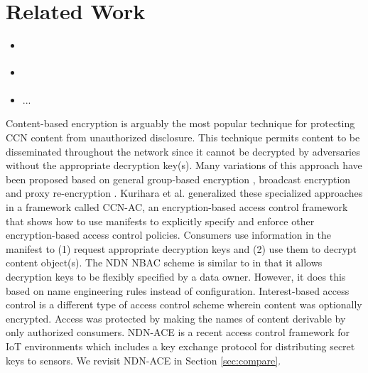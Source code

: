 \section{Related Work} \label{sec:related}

\begin{itemize}
\item \cite{tsudik2016ac3n}
\item \cite{dibenedetto2011andana}
\item ...
\end{itemize}

Content-based encryption is arguably the most popular technique for protecting CCN content from
unauthorized disclosure. This technique permits content to be disseminated throughout
the network since it cannot be decrypted by adversaries without the appropriate decryption key(s).
Many variations of this approach have been proposed based on general
group-based encryption \cite{Smetters2010}, broadcast encryption \cite{Misra2013,Ion2013} and
proxy re-encryption \cite{Wood2014}. Kurihara et al. \cite{ifip15} generalized these specialized
approaches in a framework called CCN-AC, an encryption-based access control framework
that shows how to use manifests to explicitly specify and enforce other encryption-based
access control policies. Consumers use information in the manifest to (1) request appropriate
decryption keys and (2) use them to decrypt content object(s). The NDN NBAC \cite{yu2015name}
scheme is similar to \cite{ifip15} in that it allows decryption keys to be
flexibly specified by a data owner. However, it does this based on name engineering rules instead of
configuration. Interest-based access control \cite{ghali2015interest} is a different
type of access control scheme wherein content was optionally encrypted. Access
was protected by making the names of content derivable by only authorized consumers.
NDN-ACE \cite{shangndn} is a recent access control framework for IoT environments
which includes a key exchange protocol for distributing secret keys to sensors.
We revisit NDN-ACE in Section \ref{sec:compare}.
